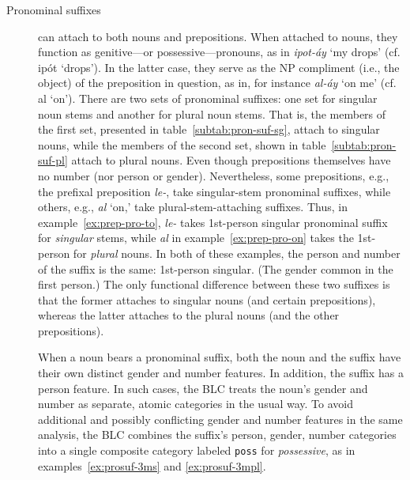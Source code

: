 \begin{description}
\item[Pronominal suffixes] can attach to both nouns and prepositions. When attached to nouns, they function as genitive---or possessive---pronouns, as in \textit{ipot-\'{a}y} `my drops' (cf. ip\'{o}t `drops').
In the latter case, they serve as the NP compliment (i.e., the object) of the preposition in question, as in, for instance \textit{al-\'{a}y} `on me' (cf. al `on').
There are two sets
of pronominal suffixes: one set for singular noun stems and another for plural noun stems. That is, the members of the first set, presented in table~\ref{subtab:pron-suf-sg}, attach to singular nouns, while the members of the second set, shown in table~\ref{subtab:pron-suf-pl} attach to plural nouns. 
Even though prepositions themselves have no number (nor person or gender). 
Nevertheless, some prepositions, e.g., the prefixal preposition \textit{le-}, take singular-stem pronominal suffixes, while others, e.g., \textit{al} `on,'
take plural-stem-attaching suffixes. Thus, in example~\ref{ex:prep-pro-to}, 
\textit{le-} takes 1st-person singular pronominal suffix for \emph{singular} stems, 
while \textit{al} in example~\ref{ex:prep-pro-on} takes the 1st-person 
for \emph{plural} nouns. In both of these examples, the person and number of the suffix is the same: 1st-person singular. (The gender common in the first person.)
The only functional difference between these two suffixes is that the former attaches to singular nouns (and certain prepositions), whereas the latter attaches to the plural nouns (and the other prepositions). 

When a noun bears a pronominal suffix, both the noun and the suffix have their 
own distinct gender and number features. In addition, the suffix has a person feature. 
In such cases, the BLC treats the noun's gender and number as separate, atomic
categories in the usual way. To avoid additional and possibly conflicting gender 
and number features in the same
analysis, the BLC combines the suffix's person, gender, number categories into 
a single composite category labeled \texttt{poss} for \textit{possessive}, as in 
examples~\ref{ex:prosuf-3ms} and \ref{ex:prosuf-3mpl}.


\end{description}
